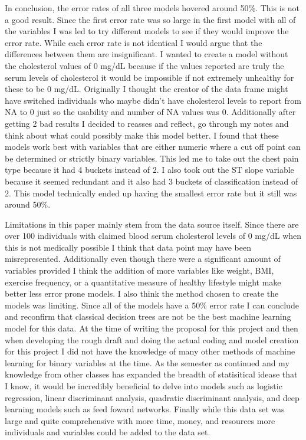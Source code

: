 \documentclass[12pt]{article}
\begin{document}
In conclusion, the error rates of all three models hovered around 50\%. This is not a good result. Since the first error rate was so large in the first model with all of the variables I was led to try different models to see if they would improve the error rate. While each error rate is not identical I would argue that the differences between them are insignificant. I wanted to create a model without the cholesterol values of 0 mg/dL because if the values reported are truly the serum levels of cholesterol it would be impossible if not extremely unhealthy for these to be 0 mg/dL. Originally I thought the creator of the data frame might have switched individuals who maybe didn’t have cholesterol levels to report from NA to 0 just so the usability and number of NA values was 0. Additionally after getting 2 bad results I decided to reasses and reflect, go through my notes and think about what could possibly make this model better. I found that these models work best with variables that are either numeric where a cut off point can be determined or strictly binary variables. This led me to take out the chest pain type because it had 4 buckets instead of 2. I also took out the ST slope variable because it seemed redundant and it also had 3 buckets of classification instead of 2. This model technically ended up having the smallest error rate but it still was around 50\%. \par 
Limitations in this paper mainly stem from the data source itself. Since there are over 100 individuals with claimed blood serum cholesterol levels of 0 mg/dL when this is not medically possible I think that data point may have been misrepresented. Additionally even though there were a significant amount of variables provided I think the addition of more variables like weight, BMI, exercise frequency, or a quantitative measure of healthy lifestyle might make better less error prone models. I also think the method chosen to create the models was limiting. Since all of the models have a 50\% error rate I can conclude and reconfirm that classical decision trees are not be the best machine learning model for this data. At the time of writing the proposal for this project and then when developing the rough draft and doing the actual coding and model creation for this project I did not have the knowledge of many other methods of machine learning for binary variables at the time. As the semester as continued and my knowledge from other classes has expanded the breadth of statisitical idease that I know, it would be incredibly beneficial to delve into models such as logistic regression, linear discriminant analysis, quadratic discriminant analysis, and deep learning models such as feed foward networks. Finally while this data set was large and quite comprehensive with more time, money, and resources more individuals and variables could be added to the data set. \par
\end{document}
